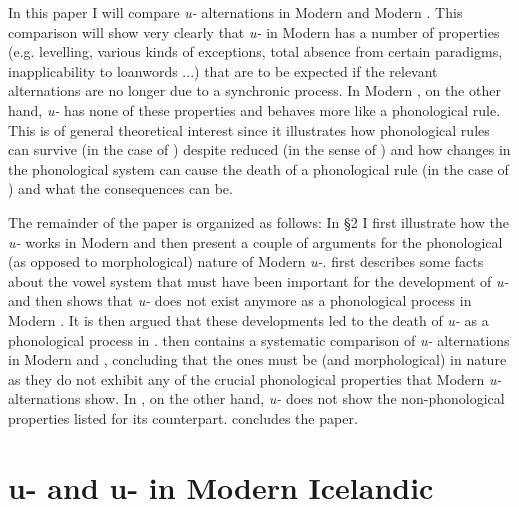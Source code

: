 \documentclass[output=paper,
modfonts
]{LSP/langsci}
\begin{document}
In this paper I will compare \emph{u-} alternations in Modern
 and Modern . This comparison will show very clearly
that \emph{u-} in Modern  has a number of properties (e.g.
 levelling, various kinds of exceptions, total absence from
certain paradigms, inapplicability to loanwords ...) that are to be
expected if the relevant alternations are no longer due to a synchronic
process. In Modern , on the other hand, \emph{u-} has
none of these properties and behaves more like a phonological rule. This
is of general theoretical interest since it illustrates how phonological
rules can survive (in the case of ) despite reduced
 (in the sense of \citealt{kiparsky1973}) and how changes in the
phonological system can cause the death of a phonological rule (in the
case of ) and what the consequences can be.

The remainder of the paper is organized as follows: In \S2 I first
illustrate how the \emph{u-} works in Modern  and
then present a couple of arguments for the phonological (as opposed to
morphological) nature of Modern  \emph{u-}. 
first describes some facts about the  vowel system that must have
been important for the development of \emph{u-} and then shows
that \emph{u-} does not exist anymore as a phonological
process in Modern . It is then argued that these developments led
to the death of \emph{u-} as a phonological process in .
 then contains a systematic comparison of \emph{u-}
alternations in Modern  and , concluding that the
 ones must be  (and morphological) in nature as they do
not exhibit any of the crucial phonological properties that Modern
 \emph{u-} alternations show. In , on the other
hand, \emph{u-} does not show the non-phonological properties
listed for its  counterpart.  concludes the paper.

\section{{u}- and {u-} in Modern Icelandic}
\end{document}
